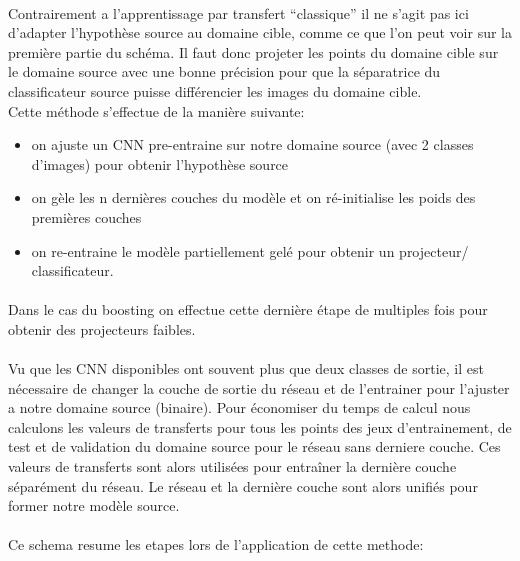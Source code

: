 \documentclass[11 pt]{article}
\begin{document}
\paragraph{}Contrairement a l’apprentissage par transfert “classique”  il ne s’agit pas ici d’adapter l'hypothèse source au domaine cible, comme ce que l’on peut voir sur la première partie du schéma. Il faut donc projeter les points du domaine cible sur le domaine source avec une bonne précision pour que la séparatrice du classificateur source puisse différencier les images du domaine cible.\\
Cette méthode s’effectue de la manière suivante:\\ \medskip
\begin{itemize}
  \item on ajuste un CNN pre-entraine sur notre domaine source (avec 2 classes d’images) pour obtenir l'hypothèse source
  \item on gèle les n dernières couches du modèle et on ré-initialise les poids des premières couches
  \item on re-entraine le modèle partiellement gelé pour obtenir un projecteur/ classificateur.
\end{itemize}

\paragraph{}Dans le cas du boosting on effectue cette dernière étape de multiples fois pour obtenir des projecteurs faibles.

\paragraph{}Vu que les CNN disponibles ont souvent plus que deux classes de sortie, il est nécessaire de changer la couche de sortie du réseau et de l’entrainer pour l’ajuster a notre domaine source (binaire). Pour économiser du temps de calcul nous calculons les valeurs de transferts pour tous les points des jeux d’entrainement, de test et de validation du domaine source pour le réseau sans derniere couche. Ces valeurs de transferts sont alors utilisées pour entraîner la dernière couche séparément du réseau. Le réseau et la dernière couche sont alors unifiés pour former notre modèle source.

\paragraph{}Ce schema resume les etapes lors de l'application de cette methode:\\ \medskip
\end{document}
